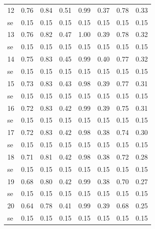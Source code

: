 \documentclass[11pt,preprint, authoryear]{elsarticle}
\numberwithin{equation}{section}
\numberwithin{figure}{section}
\numberwithin{table}{section}
\begin{document}
\begin{longtable}{lrrrrrrr}
  12 & 0.76 & 0.84 & 0.51 & 0.99 & 0.37 & 0.78 & 0.33 \\ 
  se & 0.15 & 0.15 & 0.15 & 0.15 & 0.15 & 0.15 & 0.15 \\ 
  13 & 0.76 & 0.82 & 0.47 & 1.00 & 0.39 & 0.78 & 0.32 \\ 
  se & 0.15 & 0.15 & 0.15 & 0.15 & 0.15 & 0.15 & 0.15 \\ 
  14 & 0.75 & 0.83 & 0.45 & 0.99 & 0.40 & 0.77 & 0.32 \\ 
  se & 0.15 & 0.15 & 0.15 & 0.15 & 0.15 & 0.15 & 0.15 \\ 
  15 & 0.73 & 0.83 & 0.43 & 0.98 & 0.39 & 0.77 & 0.31 \\ 
  se & 0.15 & 0.15 & 0.15 & 0.15 & 0.15 & 0.15 & 0.15 \\ 
  16 & 0.72 & 0.83 & 0.42 & 0.99 & 0.39 & 0.75 & 0.31 \\ 
  se & 0.15 & 0.15 & 0.15 & 0.15 & 0.15 & 0.15 & 0.15 \\ 
  17 & 0.72 & 0.83 & 0.42 & 0.98 & 0.38 & 0.74 & 0.30 \\ 
  se & 0.15 & 0.15 & 0.15 & 0.15 & 0.15 & 0.15 & 0.15 \\ 
  18 & 0.71 & 0.81 & 0.42 & 0.98 & 0.38 & 0.72 & 0.28 \\ 
  se & 0.15 & 0.15 & 0.15 & 0.15 & 0.15 & 0.15 & 0.15 \\ 
  19 & 0.68 & 0.80 & 0.42 & 0.99 & 0.38 & 0.70 & 0.27 \\ 
  se & 0.15 & 0.15 & 0.15 & 0.15 & 0.15 & 0.15 & 0.15 \\ 
  20 & 0.64 & 0.78 & 0.41 & 0.99 & 0.39 & 0.68 & 0.25 \\ 
  se & 0.15 & 0.15 & 0.15 & 0.15 & 0.15 & 0.15 & 0.15 \\ 
   \bottomrule
\end{longtable}
\endgroup


\end{document}
